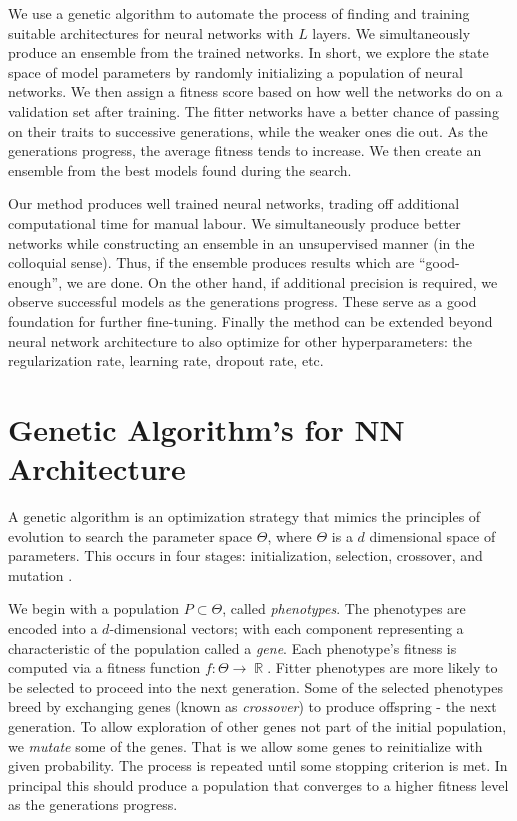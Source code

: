 \documentclass{article}
\DeclareMathOperator{\R}{\mathbb{R}}
\DeclareMathOperator{\1}{\mathbbm{1}}
\begin{document}
We use a genetic algorithm to automate the process of finding and training suitable architectures
for neural networks with $L$ layers. We simultaneously produce an ensemble from the trained networks. 
In short, we explore the state space of model parameters by randomly initializing a population of neural networks. 
We then assign a fitness score based on how well the networks do on a validation set after training. 
The fitter networks have a better chance of passing on their traits to 
successive generations, while the weaker ones die out. 
As the generations progress, the average fitness tends to increase.
We then create an ensemble from the best models found during the search. 


Our method produces well trained neural networks, trading off additional computational time for manual labour.
We simultaneously produce better networks while constructing an ensemble in an unsupervised manner
(in the colloquial sense). Thus, if the ensemble produces results which are ``good-enough'', we are done.
On the other hand, if additional precision is required, we observe successful models as the generations progress. 
These serve as a good foundation for further fine-tuning. Finally the method can be extended beyond neural network architecture
to also optimize for other hyperparameters: the regularization rate, learning rate, dropout rate, etc.


\section{Genetic Algorithm's for NN Architecture}
A genetic algorithm is an optimization strategy that mimics the principles
of evolution to search the parameter space $\Theta$, where $\Theta$ is a $d$ dimensional space of parameters. 
This occurs in four stages: initialization, selection, crossover, and mutation \cite{Mitchell}.

We begin with a population $P\subset \Theta$, called \emph{phenotypes}.
The phenotypes are encoded into a $d$-dimensional vectors; with each component representing a characteristic of the population
called a \emph{gene}. Each phenotype's fitness is computed via a fitness function
$f:\Theta\rightarrow\R$. Fitter phenotypes are more likely to be selected to proceed into the next generation. 
Some of the selected phenotypes breed by exchanging genes (known as \emph{crossover}) to produce offspring - the next generation. 
To allow exploration of other genes not part of the initial population,
we \emph{mutate} some of the genes. That is we allow some genes to reinitialize with given probability.  
The process is repeated until some stopping criterion is met.  In principal this should produce a population that converges
to a higher fitness level as the generations progress.  
\end{document}

